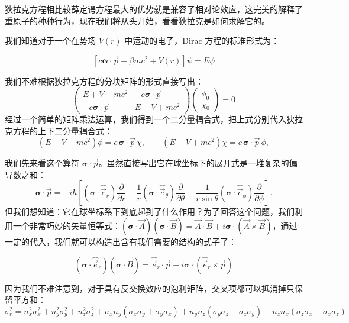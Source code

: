 \documentclass[UTF8]{ctexbook}
\begin{document}
狄拉克方程相比较薛定谔方程最大的优势就是兼容了相对论效应，这完美的解释了重原子的种种行为，现在我们将从头开始，看看狄拉克是如何求解它的。

我们知道对于一个在势场 \(V(r)\) 中运动的电子，Dirac 方程的标准形式为：

\[
\left[ c \boldsymbol{\alpha} \cdot \vec{p} + \beta m c^2 + V(r) \right] \psi = E \psi
\]

我们不难根据狄拉克方程的分块矩阵的形式直接写出：
\[
\begin{pmatrix} E + V - mc^2 & -c\boldsymbol{\sigma}\cdot\vec{p} \\ -c\boldsymbol{\sigma}\cdot\vec{p} & E + V + mc^2 \end{pmatrix} \begin{pmatrix} \phi_0 \\ \chi_0 \end{pmatrix} = 0
\]
经过一个简单的矩阵乘法运算，我们得到一个二分量耦合式，把上式分别代入狄拉克方程的上下二分量耦合式：
\[
(E-V-mc^2)\phi=c\,\boldsymbol\sigma\cdot\vec{p}\,\chi,\qquad
(E-V+mc^2)\chi=c\,\boldsymbol\sigma\cdot\vec{p}\,\phi,
\]






我们先来看这个算符 $\boldsymbol{\sigma}\cdot\vec{p}$。虽然直接写出它在球坐标下的展开式是一堆复杂的偏导数之和：
\[
\boldsymbol{\sigma}\cdot\vec{p}
=-i\hbar\left[
(\boldsymbol{\sigma}\cdot\hat{\vec{e}}_r)\frac{\partial}{\partial r}
+\frac{1}{r}(\boldsymbol{\sigma}\cdot\hat{\vec{e}}_\theta)\frac{\partial}{\partial \theta}
+\frac{1}{r\sin\theta}(\boldsymbol{\sigma}\cdot\hat{\vec{e}}_\phi)\frac{\partial}{\partial \phi}
\right].
\]
但我们想知道：它在球坐标系下到底起到了什么作用？为了回答这个问题，我们利用一个非常巧妙的矢量恒等式：$(\boldsymbol{\sigma} \cdot \vec{A})(\boldsymbol{\sigma} \cdot \vec{B}) = \vec{A} \cdot \vec{B} + i \boldsymbol{\sigma} \cdot (\vec{A} \times \vec{B})$，通过一定的代入，我们就可以构造出含有我们需要的结构的式子了：

\[
(\boldsymbol{\sigma} \cdot \hat{\vec{e}}_r)(\boldsymbol{\sigma} \cdot \vec{B}) = \hat{\vec{e}}_r \cdot \vec{p} + i \boldsymbol{\sigma} \cdot (\hat{\vec{e}}_r \times \vec{p})
\]


因为我们不难注意到，对于具有反交换效应的泡利矩阵，交叉项都可以抵消掉只保留平方和：
\[ \sigma_r^2 = n_x^2 \sigma_x^2 + n_y^2 \sigma_y^2 + n_z^2 \sigma_z^2 + n_x n_y (\sigma_x \sigma_y + \sigma_y \sigma_x) + n_y n_z (\sigma_y \sigma_z + \sigma_z \sigma_y) + n_z n_x (\sigma_z \sigma_x + \sigma_x \sigma_z) 
\]
\end{document}
